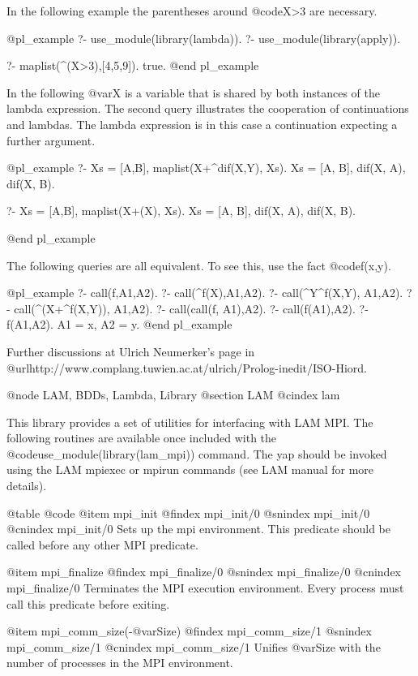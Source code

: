 In the following example the parentheses around @code{X>3} are necessary.

@pl_example
?- use_module(library(lambda)).
?- use_module(library(apply)).

?- maplist(\X^(X>3),[4,5,9]).
true.
@end pl_example

In the following @var{X} is a variable that is shared by both instances
of the lambda expression. The second query illustrates the cooperation
of continuations and lambdas. The lambda expression is in this case a
continuation expecting a further argument.

@pl_example
?- Xs = [A,B], maplist(X+\Y^dif(X,Y), Xs).
Xs = [A, B],
dif(X, A),
dif(X, B).

?- Xs = [A,B], maplist(X+\dif(X), Xs).
Xs = [A, B],
dif(X, A),
dif(X, B).

@end pl_example

The following queries are all equivalent. To see this, use
the fact @code{f(x,y)}.

@pl_example
?- call(f,A1,A2).
?- call(\X^f(X),A1,A2).
?- call(\X^Y^f(X,Y), A1,A2).                                                                                                            
?- call(\X^(X+\Y^f(X,Y)), A1,A2).
?- call(call(f, A1),A2).
?- call(f(A1),A2).
?- f(A1,A2).
A1 = x,
A2 = y.
@end pl_example

Further discussions
at Ulrich Neumerker's page in @url{http://www.complang.tuwien.ac.at/ulrich/Prolog-inedit/ISO-Hiord}.


@node LAM, BDDs, Lambda, Library
@section LAM
@cindex lam

This library provides a set of utilities for interfacing with LAM MPI.
The following routines are available once included with the
@code{use_module(library(lam_mpi))} command. The yap should be
invoked using the LAM mpiexec or mpirun commands (see LAM manual for
more details).

@table @code
@item mpi_init
@findex mpi_init/0
@snindex mpi_init/0
@cnindex mpi_init/0
      Sets up the mpi environment. This predicate should be called before any other MPI predicate.

@item mpi_finalize
@findex mpi_finalize/0
@snindex mpi_finalize/0
@cnindex mpi_finalize/0
      Terminates the MPI execution environment. Every process must call this predicate before  exiting.

@item mpi_comm_size(-@var{Size})
@findex mpi_comm_size/1
@snindex mpi_comm_size/1
@cnindex mpi_comm_size/1
      Unifies @var{Size} with the number of processes in the MPI environment.


